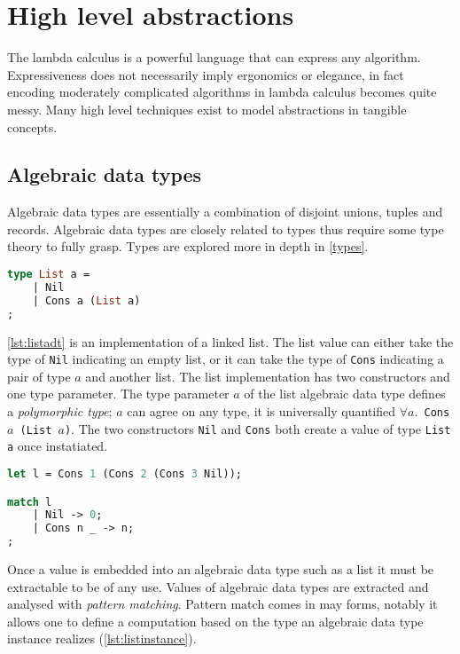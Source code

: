 \documentclass[11pt,oneside,a4paper]{report}
\begin{document}
\section{High level abstractions}\label{sec:highlevel}
The lambda calculus is a powerful language that can express any algorithm.
Expressiveness does not necessarily imply ergonomics or elegance, in fact encoding moderately complicated algorithms in lambda calculus becomes quite messy.
Many high level techniques exist to model abstractions in tangible concepts.

\subsection{Algebraic data types}
\label{sec:adt}
Algebraic data types are essentially a combination of disjoint unions, tuples and records.
Algebraic data types are closely related to types thus require some type theory to fully grasp.
Types are explored more in depth in \autoref{types}.
\begin{lstlisting}[float,language=ML,caption={List algebraic data type},label={lst:listadt}]
type List a = 
    | Nil
    | Cons a (List a)
;
\end{lstlisting}
\autoref{lst:listadt} is an implementation of a linked list. 
The list value can either take the type of \texttt{Nil} indicating an empty list, or it can take the type of \texttt{Cons} indicating a pair of type $a$ and another list.
The list implementation has two constructors and one type parameter.
The type parameter $a$ of the list algebraic data type defines a \textit{polymorphic type}; $a$ can agree on any type, it is universally quantified \texttt{$\forall a. $ Cons $a$ (List $a$)}.
The two constructors \texttt{Nil} and \texttt{Cons} both create a value of type \texttt{List a} once instatiated.
\begin{lstlisting}[float,language=ML,caption={List instance and match},label={lst:listinstance}]
let l = Cons 1 (Cons 2 (Cons 3 Nil));

match l 
    | Nil -> 0;
    | Cons n _ -> n;
;
\end{lstlisting}
Once a value is embedded into an algebraic data type such as a list it must be extractable to be of any use.
Values of algebraic data types are extracted and analysed with \textit{pattern matching}.
Pattern match comes in may forms, notably it allows one to define a computation based on the type an algebraic data type instance realizes (\autoref{lst:listinstance}).
\end{document}
